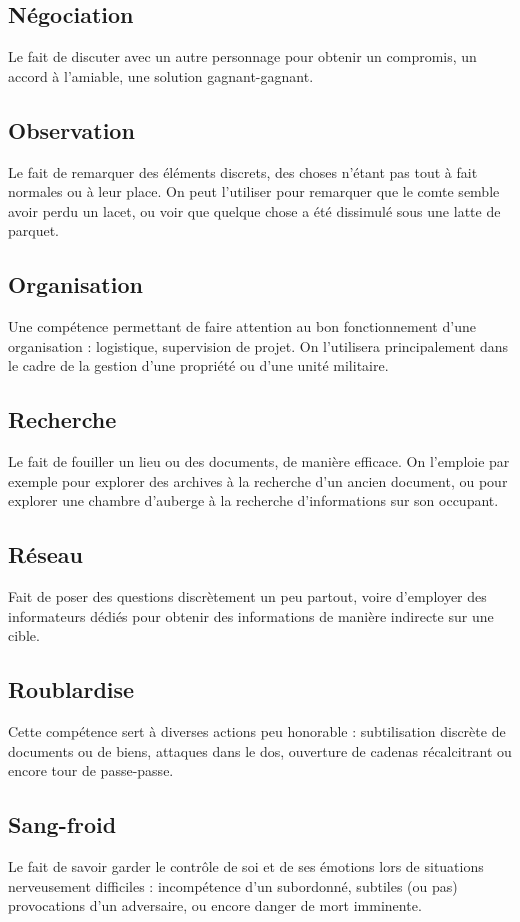 \documentclass[10pt,a4paper]{book}
\begin{document}
\begin{multicols}{2}
\subsection*{Négociation} Le fait de discuter avec un autre personnage pour obtenir un compromis, un accord à l'amiable, une solution gagnant-gagnant.
\subsection*{Observation}Le fait de remarquer des éléments discrets, des choses n'étant pas tout à fait normales ou à leur place. On peut l'utiliser pour remarquer que le comte semble avoir perdu un lacet, ou voir que quelque chose a été dissimulé sous une latte de parquet.
\subsection*{Organisation} Une compétence permettant de faire attention au bon fonctionnement d'une organisation : logistique, supervision de projet. On l'utilisera principalement dans le cadre de la gestion d'une propriété ou d'une unité militaire.
\subsection*{Recherche}Le fait de fouiller un lieu ou des documents, de manière efficace. On l'emploie par exemple pour explorer des archives à la recherche d'un ancien document, ou pour explorer une chambre d'auberge à la recherche d'informations sur son occupant.
\subsection*{Réseau} Fait de poser des questions discrètement un peu partout, voire d'employer des informateurs dédiés pour obtenir des informations de manière indirecte sur une cible. 
\subsection*{Roublardise} Cette compétence sert à diverses actions peu honorable : subtilisation discrète de documents ou de biens, attaques dans le dos, ouverture de cadenas récalcitrant ou encore tour de passe-passe.
\subsection*{Sang-froid} Le fait de savoir garder le contrôle de soi et de ses émotions lors de situations nerveusement difficiles : incompétence d'un subordonné, subtiles (ou pas) provocations d'un adversaire, ou encore danger de mort imminente.

\end{multicols}
\end{document}
